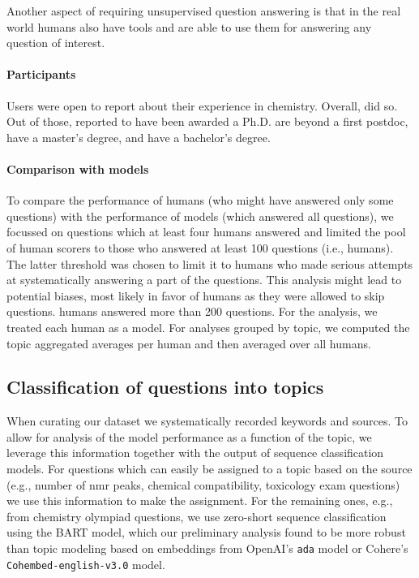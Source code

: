 \documentclass[11pt, oneside]{article}
\begin{document}
\begin{refsection}
Another aspect of requiring unsupervised question answering is that in the real world humans also have tools and are able to use them for answering any question of interest. 

\paragraph{Participants}
Users were open to report about their experience in chemistry. 
Overall,  did so. 
Out of those,  reported to have been awarded a Ph.D.
 are beyond a first postdoc,  have a master's degree, and  have a bachelor's degree.


\paragraph{Comparison with models}
To compare the performance of humans (who might have answered only some questions) with the performance of models (which answered all questions), we focussed on questions which at least four humans answered and limited the pool of human scorers to those who answered at least 100 questions (i.e.,  humans). 
The latter threshold was chosen to limit it to humans who made serious attempts at systematically answering a part of the questions. 
This analysis might lead to potential biases, most likely in favor of humans as they were allowed to skip questions.  humans answered more than 200 questions.
For the analysis, we treated each human as a model. For analyses grouped by topic, we computed the topic aggregated averages per human and then averaged over all humans.

\subsection{Classification of questions into topics}\label{sec:meth-topic} When curating our dataset we systematically recorded keywords and sources.
To allow for analysis of the model performance as a function of the topic, we leverage this information together with the output of sequence classification models.
For questions which can easily be assigned to a topic based on the source (e.g., number of \gls{nmr} peaks, chemical compatibility, toxicology exam questions) we use this information to make the assignment.
For the remaining ones, e.g., from chemistry olympiad questions, we use zero-short sequence classification\autocite{zeroshotsequence} using the BART model\autocite{bart, FacebookBART}, which our preliminary analysis found to be more robust than topic modeling based on embeddings from OpenAI's \texttt{ada} model or Cohere's \texttt{Cohembed-english-v3.0} model.



\end{refsection}
\end{document}
